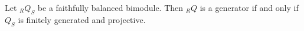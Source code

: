 Let ${}_R Q_S$ be a faithfully balanced bimodule. Then ${}_R Q$ is a generator if and only if $Q_S$ is finitely generated and projective.
